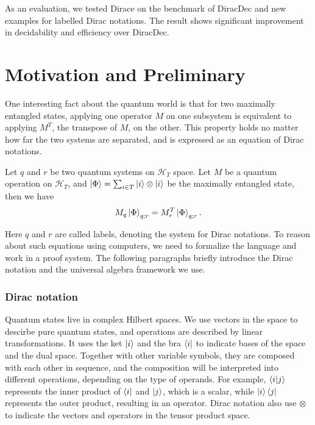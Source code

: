 \documentclass[runningheads]{llncs}
\newcommand{\yx}[1]{\textit{\color{blue}[YX] : #1}}
\begin{document}
As an evaluation, we tested Dirace on the benchmark of DiracDec and new examples for labelled Dirac notations. 
The result shows significant improvement in decidability and efficiency over DiracDec.






\section{Motivation and Preliminary}
One interesting fact about the quantum world is that for two maximally entangled states, applying one operator $M$ on one subsystem is equivalent to applying $M^T$, the transpose of $M$, on the other. This property holds no matter how far the two systems are separated, and is expressed as an equation of Dirac notations.
\begin{example}
    \label{ex: motivating}
    Let $q$ and $r$ be two quantum systems on $\mathcal{H}_T$ space. Let $M$ be a quantum operation on $\mathcal{H}_T$,
    and $\ket{\Phi} = \sum_{i \in T} \ket{i}\otimes \ket{i}$ be the maximally entangled state, then we have
    \[
    M_q \ket{\Phi}_{q; r} = M_r^T \ket{\Phi}_{q; r}.
    \]
\end{example}
Here $q$ and $r$ are called labels, denoting the system for Dirac notations.
To reason about such equations using computers, we need to formalize the language and work in a proof system.
The following paragraphs briefly introduce the Dirac notation and the universal algebra framework we use.

\subsubsection{Dirac notation}
Quantum states live in complex Hilbert spaces. We use vectors in the space to descirbe pure quantum states, and operations are described by linear transformations. 
It uses the ket $\ket{i}$ and the bra $\bra{i}$ to indicate bases of the space and the dual space. Together with other variable symbols, they are composed with each other in sequence, and the composition will be interpreted into different operations, depending on the type of operands. For example, $\braket{i|j}$ represents the inner product of $\bra{i}$ and $\ket{j}$, which is a scalar, while $\ket{i}\bra{j}$ represents the outer product, resulting in an operator. 
Dirac notation also use $\otimes$ to indicate the vectors and operators in the tensor product space.
\end{document}
